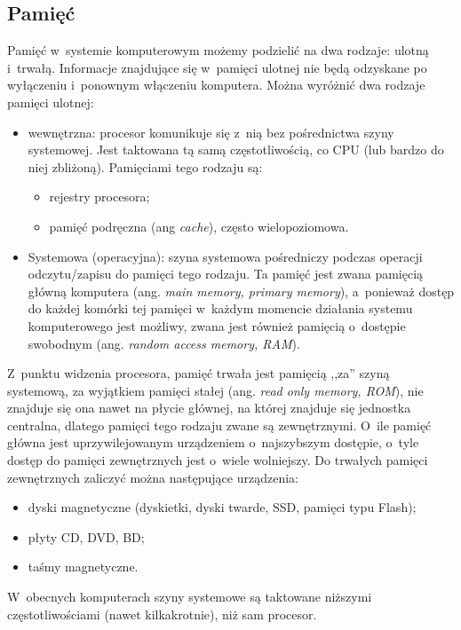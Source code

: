 \documentclass[12pt]{mwart}
\begin{document}
\subsection{Pamięć}
\indent
	Pamięć w~systemie komputerowym możemy podzielić na dwa rodzaje: ulotną i~trwałą. Informacje znajdujące się w~pamięci ulotnej
	nie będą odzyskane po wyłączeniu i~ponownym włączeniu komputera. Można wyróżnić dwa rodzaje pamięci ulotnej:
	\begin{itemize}
		\item wewnętrzna: procesor komunikuje się z~nią bez pośrednictwa szyny systemowej. Jest taktowana tą samą częstotliwością, co CPU
			(lub bardzo do niej zbliżoną). Pamięciami tego rodzaju są:
			\begin{itemize}
				\item rejestry procesora;
				\item pamięć podręczna (ang \emph{cache}), często wielopoziomowa.
			\end{itemize}
		\item Systemowa (operacyjna): szyna systemowa pośredniczy podczas operacji odczytu/zapisu do pamięci tego rodzaju. Ta pamięć jest zwana
			pamięcią główną komputera (ang. \emph{main memory, primary memory}), a~ponieważ dostęp do każdej komórki tej pamięci
			w~każdym momencie działania systemu komputerowego jest możliwy, zwana jest również pamięcią o~dostępie swobodnym
			(ang. \emph{random access memory, RAM}).
	\end{itemize}
	Z~punktu widzenia procesora, pamięć trwała jest pamięcią ,,za'' szyną systemową, za wyjątkiem pamięci stałej (ang. \emph{read only memory, ROM}),
	nie znajduje się ona nawet na płycie głównej, na której znajduje się jednostka centralna, dlatego pamięci tego rodzaju zwane są 
	zewnętrznymi. O~ile pamięć główna jest uprzywilejowanym urządzeniem o~najszybszym dostępie, o~tyle dostęp do pamięci
	zewnętrznych jest o~wiele wolniejszy. Do trwałych pamięci zewnętrznych zaliczyć można następujące urządzenia:
	\begin{itemize}
		\item dyski magnetyczne (dyskietki, dyski twarde, SSD, pamięci typu Flash);
		\item płyty CD, DVD, BD;
		\item taśmy magnetyczne.
	\end{itemize}
\par
%
\indent
	W~obecnych komputerach szyny systemowe są taktowane niższymi częstotliwościami (nawet kilkakrotnie), niż sam procesor.
\end{document}
